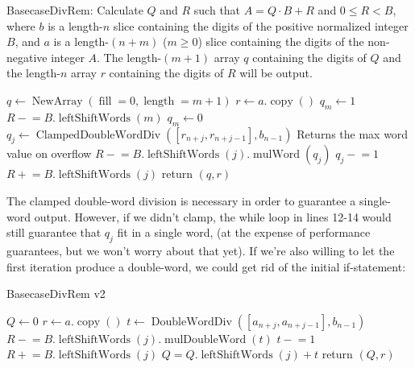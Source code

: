 \documentclass{computer-arithmetic}
\begin{document}
\begin{algorithm}
  \caption{BasecaseDivRem: Calculate \(Q\) and \(R\) such that
    \(A = Q ⋅ B + R\) and \(0 ≤ R < B\), where \(b\) is a length-\(n\)
    slice containing the digits of the positive normalized integer
    \(B\), and \(a\) is a length-\((n + m)\) (\(m ≥ 0\)) slice
    containing the digits of the non-negative integer \(A\). The
    length-\((m+1)\) array \(q\) containing the digits of \(Q\) and
    the length-\(n\) array \(r\) containing the digits of \(R\) will
    be output.}
  \begin{algorithmic}[1]
    \State \(q ← \operatorname{NewArray}(\operatorname{fill}=0, \operatorname{length}=m + 1)\)
\State \(r ← a.\operatorname{copy}()\)
\State \(q_m ← 1\)
\State \(R \mathrel{-}= B.\operatorname{leftShiftWords}(m)\)
\Else
\State \(q_m ← 0\)
\EndIf
{}
\State \(q_j ← \operatorname{ClampedDoubleWordDiv}([r_{n+j}, r_{n + j - 1}], b_{n-1})\)
\Comment Returns the max word value on overflow
\State \(R \mathrel{-}= B.\operatorname{leftShiftWords}(j).\operatorname{mulWord}(q_j)\)
\State \(q_j \mathrel{-}= 1\)
\State \(R \mathrel{+}= B.\operatorname{leftShiftWords}(j)\)
\EndWhile
\EndFor
\State return \((q, r)\)
\end{algorithmic}
\end{algorithm}

The clamped double-word division is necessary in order to guarantee a
single-word output. However, if we didn't clamp, the while loop in
lines 12-14 would still guarantee that \(q_j\) fit in a single word,
(at the expense of performance guarantees, but we won't worry about
that yet). If we're also willing to let the first iteration produce a
double-word, we could get rid of the initial if-statement:

\begin{algorithm}
  \caption{BasecaseDivRem v2}
  \begin{algorithmic}[1]
    \State \(Q ← 0\)
\State \(r ← a.\operatorname{copy}()\)
\State \(t ← \operatorname{DoubleWordDiv}([a_{n+j}, a_{n + j - 1}], b_{n-1})\)
\State \(R \mathrel{-}= B.\operatorname{leftShiftWords}(j).\operatorname{mulDoubleWord}(t)\)
\State \(t \mathrel{-}= 1\)
\State \(R \mathrel{+}= B.\operatorname{leftShiftWords}(j)\)
\EndWhile
\State \(Q = Q.\operatorname{leftShiftWords}(j) + t\)
\EndFor
\State return \((Q, r)\)
\end{algorithmic}
\end{algorithm}
\end{document}

